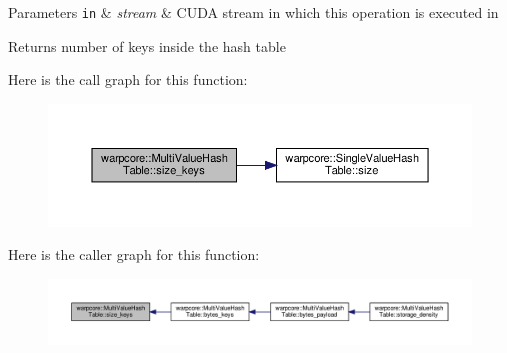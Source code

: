 \begin{DoxyParams}[1]{Parameters}
\mbox{\tt in}  & {\em stream} & C\+U\+DA stream in which this operation is executed in \\
\hline
\end{DoxyParams}
\begin{DoxyReturn}{Returns}
number of keys inside the hash table 
\end{DoxyReturn}
Here is the call graph for this function\+:
\nopagebreak
\begin{figure}[H]
\begin{center}
\leavevmode
\includegraphics[width=350pt]{classwarpcore_1_1MultiValueHashTable_a9ab8c6741cc029d28bb4435b54bdf3d6_cgraph}
\end{center}
\end{figure}
Here is the caller graph for this function\+:
\nopagebreak
\begin{figure}[H]
\begin{center}
\leavevmode
\includegraphics[width=350pt]{classwarpcore_1_1MultiValueHashTable_a9ab8c6741cc029d28bb4435b54bdf3d6_icgraph}
\end{center}
\end{figure}
\mbox{\label{classwarpcore_1_1MultiValueHashTable_a8e1c0d96983af892804a6513964692c2}} 
